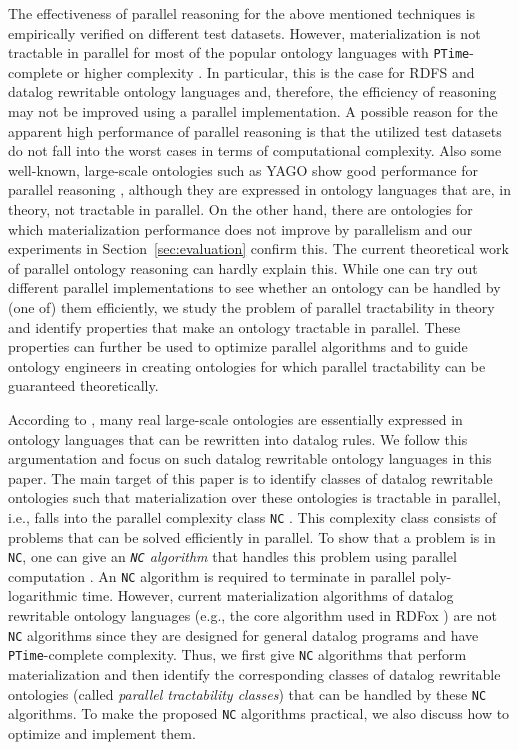 The effectiveness of parallel reasoning for the above mentioned techniques is empirically verified on different test datasets.
However, materialization is not tractable in parallel for most of the popular ontology languages with \texttt{PTime}-complete or higher complexity \cite{Raymond95}. In particular, this is the case for RDFS and datalog rewritable ontology languages and, therefore, the efficiency of reasoning may not be
improved using a parallel implementation. A possible reason for the apparent high performance of parallel
reasoning is that the utilized test datasets do not fall into the worst cases in terms of computational complexity. Also some well-known, large-scale ontologies such as YAGO show good performance for parallel
reasoning \cite{KolovskiWE10}, although they are expressed in ontology languages that are, in theory, not tractable in parallel.
On the other hand, there are ontologies for which materialization performance does not improve by parallelism and our experiments in Section~\ref{sec:evaluation} confirm this.
The current theoretical work of parallel ontology reasoning can hardly explain this.
While one can try out different parallel implementations to see whether an ontology can be handled by (one of) them efficiently,
we study the problem of parallel tractability in theory and identify properties that make an ontology tractable in parallel.
These properties can further be used to optimize parallel algorithms and to guide ontology engineers in creating ontologies
for which parallel tractability can be guaranteed theoretically.

According to \citet{MotikNPHO14}, many real large-scale ontologies are essentially expressed in ontology languages
that can be rewritten into datalog rules. We follow this argumentation and focus on such datalog rewritable ontology languages in this paper.
The main target of this paper is to identify classes of datalog rewritable ontologies such that materialization
over these ontologies is tractable in parallel, i.e., falls into the parallel complexity class \texttt{NC} \cite{Raymond95}.
This complexity class consists of problems that can be solved efficiently in parallel.
To show that a problem is in \texttt{NC}, one can give an \emph{\texttt{NC} algorithm} that handles this problem
using parallel computation \cite{Raymond95}.
An \texttt{NC} algorithm is required to terminate in parallel poly-logarithmic time.
However, \mbox{current} materialization algorithms of datalog rewritable ontology languages
(e.g., the core algorithm used in RDFox \cite{MotikNPHO14}) are not \texttt{NC} algorithms
since they are designed for general datalog programs and have \texttt{PTime}-complete complexity.
Thus, we first give \texttt{NC} algorithms that perform materialization
and then identify the corresponding classes of datalog rewritable ontologies (called \emph{parallel tractability classes})
that can be handled by these \texttt{NC} algorithms. To make the proposed \texttt{NC} algorithms practical,
we also discuss how to optimize and implement them.

